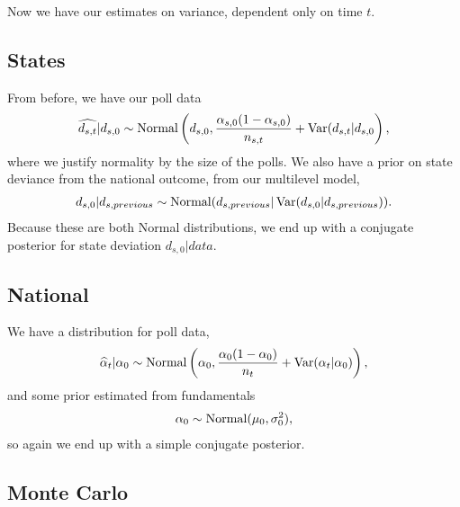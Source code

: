 \documentclass[thesis.tex]{subfiles}
\begin{document}
Now we have our estimates on variance, dependent only on time \(t\).

\subsection{States}

From before, we have our poll data \begin{equation}\begin{aligned}
\widehat{d_{s, t}} | d_{s, 0} \sim \operatorname{Normal}\left(d_{s, 0}, \frac{\alpha_{s, 0} (1 - \alpha_{s, 0})}{n_{s, t}} + \operatorname{Var}(d_{s, t} | d_{s, 0}\right),
\end{aligned}\end{equation} where we justify normality by the size of the polls. We also have a prior on state deviance from the national outcome, from our multilevel model, \begin{equation}\begin{aligned}
d_{s, 0} | d_{s, previous} \sim \operatorname{Normal}(d_{s, previous} | \operatorname{Var}(d_{s, 0} | d_{s, previous})).
\end{aligned}\end{equation} Because these are both Normal distributions, we end up with a conjugate posterior for state deviation \(d_{s, 0} | data\).

\subsection{National}

We have a distribution for poll data, \begin{equation}\begin{aligned}
\widehat{\alpha}_t | \alpha_0 \sim \operatorname{Normal}\left( \alpha_0, \frac{\alpha_0 (1 - \alpha_0)}{n_t} + \operatorname{Var}(\alpha_t | \alpha_0) \right),
\end{aligned}\end{equation} and some prior estimated from fundamentals \begin{equation}\begin{aligned}
	\alpha_0 \sim \operatorname{Normal}(\mu_0, \sigma_0^2),
\end{aligned}\end{equation} so again we end up with a simple conjugate posterior.

\begin{comment}
	TODO Should be weighted average on the Var(d_st, d_s0) stuff.
\end{comment}

\subsection{Monte Carlo}
\end{document}
